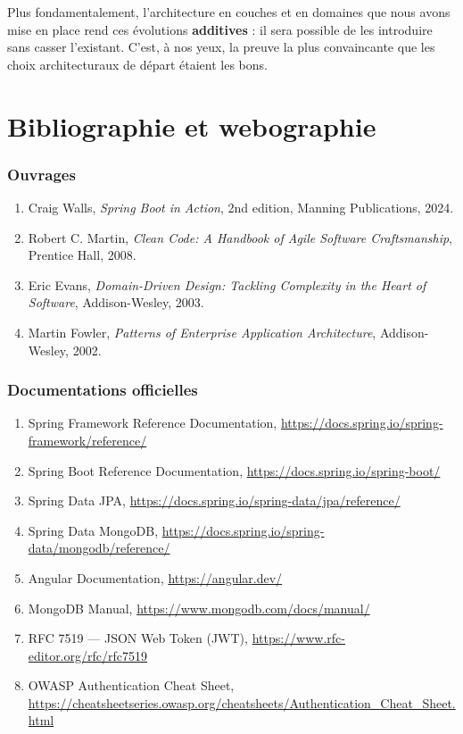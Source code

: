 \documentclass[11pt,a4paper,oneside]{report}
\begin{document}
Plus fondamentalement, l'architecture en couches et en domaines que nous
avons mise en place rend ces évolutions \textbf{additives} : il sera
possible de les introduire sans casser l'existant. C'est, à nos yeux, la
preuve la plus convaincante que les choix architecturaux de départ étaient
les bons.

\chapter*{Bibliographie et webographie}

\subsection*{Ouvrages}

\begin{enumerate}
  \item Craig Walls, \textit{Spring Boot in Action}, 2nd edition,
    Manning Publications, 2024.
  \item Robert C. Martin, \textit{Clean Code: A Handbook of Agile Software
    Craftsmanship}, Prentice Hall, 2008.
  \item Eric Evans, \textit{Domain-Driven Design: Tackling Complexity in
    the Heart of Software}, Addison-Wesley, 2003.
  \item Martin Fowler, \textit{Patterns of Enterprise Application
    Architecture}, Addison-Wesley, 2002.
\end{enumerate}

\subsection*{Documentations officielles}

\begin{enumerate}
  \item Spring Framework Reference Documentation, \url{https://docs.spring.io/spring-framework/reference/}
  \item Spring Boot Reference Documentation, \url{https://docs.spring.io/spring-boot/}
  \item Spring Data JPA, \url{https://docs.spring.io/spring-data/jpa/reference/}
  \item Spring Data MongoDB, \url{https://docs.spring.io/spring-data/mongodb/reference/}
  \item Angular Documentation, \url{https://angular.dev/}
  \item MongoDB Manual, \url{https://www.mongodb.com/docs/manual/}
  \item RFC 7519 — JSON Web Token (JWT), \url{https://www.rfc-editor.org/rfc/rfc7519}
  \item OWASP Authentication Cheat Sheet, \url{https://cheatsheetseries.owasp.org/cheatsheets/Authentication_Cheat_Sheet.html}
\end{enumerate}
\end{document}
